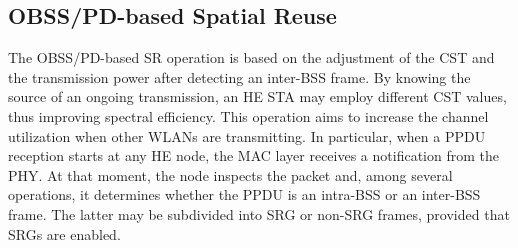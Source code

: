 \documentclass[comsoc]{IEEEtran}
\begin{document}
	\subsection{OBSS/PD-based Spatial Reuse}
	\label{section:obss_pd_based}
	The OBSS/PD-based SR operation is based on the adjustment of the CST and the transmission power after detecting an inter-BSS frame. By knowing the source of an ongoing transmission, an HE STA may employ different CST values, thus improving spectral efficiency. This operation aims to increase the channel utilization when other WLANs are transmitting. In particular, when a PPDU reception starts at any HE node, the MAC layer receives a notification from the PHY. At that moment, the node inspects the packet and, among several operations, it determines whether the PPDU is an intra-BSS or an inter-BSS frame. The latter may be subdivided into SRG or non-SRG frames, provided that SRGs are enabled.
	
\end{document}
